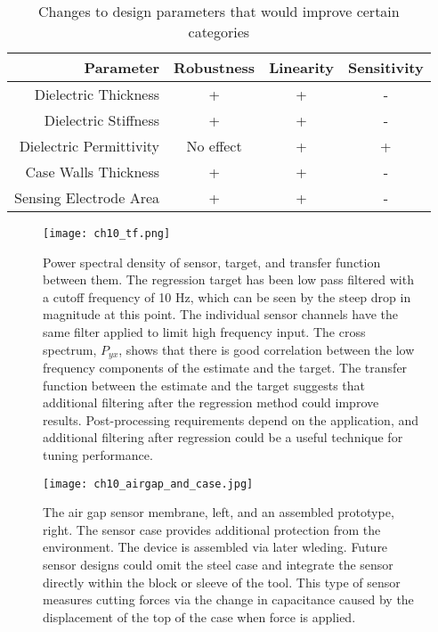 \begin{table}[]
\centering
\caption{Changes to design parameters that would improve certain categories}
\label{tab:improve}
\begin{tabular}{|r|c|c|c|}
\hline
Parameter               & Robustness   & Linearity    & Sensitivity               \\ \hline
Dielectric Thickness    & +            & +            & -   \\ \hline
Dielectric Stiffness    & +            & +            & -   \\ \hline
Dielectric Permittivity & No effect    & +            & +   \\ \hline
Case Walls Thickness    & +            & +            & -   \\ \hline
Sensing Electrode Area  & +            & +            & -   \\ \hline
\end{tabular}
\end{table}

\begin{figure}[ht]
\centering
\texttt{[image: ch10\_tf.png]}
\caption{
Power spectral density of sensor, target, and transfer function between them.
The regression target has been low pass filtered with a cutoff frequency of 10 Hz,
which can be seen by the steep drop in magnitude at this point.
The individual sensor channels have the same filter applied to limit high frequency input.
The cross spectrum, $P_{yx}$, shows that there is good correlation between the low frequency
components of the estimate and the target.
The transfer function between the estimate and the target suggests that additional 
filtering after the regression method could improve results.
Post-processing requirements depend on the application, and 
additional filtering after regression could be a useful technique for tuning performance.
}
\label{fig:sense_tf}
\end{figure}

\begin{figure}[ht]
\centering
\texttt{[image: ch10\_airgap\_and\_case.jpg]}
\caption{
The air gap sensor membrane, left, and an assembled prototype, right.
The sensor case provides additional protection from the environment.
The device is assembled via later wleding.
Future sensor designs could omit the steel case and integrate the sensor directly within
the block or sleeve of the tool.
This type of sensor measures cutting forces via the change in capacitance caused
by the displacement of the top of the case when force is applied. 
}
\label{fig:airgap}
\end{figure}

